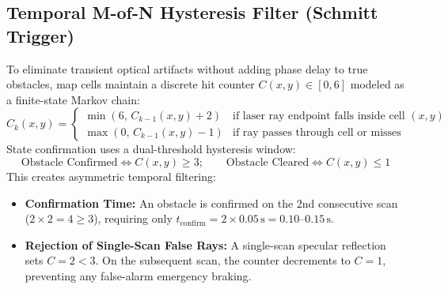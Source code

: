 \documentclass[11pt, a4paper]{article}
\begin{document}
\subsection{Temporal M-of-N Hysteresis Filter (Schmitt Trigger)}
To eliminate transient optical artifacts without adding phase delay to true obstacles, map cells maintain a discrete hit counter $C(x, y) \in [0, 6]$ modeled as a finite-state Markov chain:
\begin{equation}
    C_k(x, y) = \begin{cases} \min(6, \, C_{k-1}(x, y) + 2) & \text{if laser ray endpoint falls inside cell } (x, y) \\ \max(0, \, C_{k-1}(x, y) - 1) & \text{if ray passes through cell or misses} \end{cases}
\end{equation}
State confirmation uses a dual-threshold hysteresis window:
\begin{equation}
    \text{Obstacle Confirmed} \iff C(x, y) \ge 3; \qquad \text{Obstacle Cleared} \iff C(x, y) \le 1
\end{equation}
This creates asymmetric temporal filtering:
\begin{itemize}
    \item \textbf{Confirmation Time:} An obstacle is confirmed on the 2nd consecutive scan ($2 \times 2 = 4 \ge 3$), requiring only $t_{\text{confirm}} = 2 \times 0.05\,\text{s} = 0.10\text{--}0.15\,\text{s}$.
    \item \textbf{Rejection of Single-Scan False Rays:} A single-scan specular reflection sets $C = 2 < 3$. On the subsequent scan, the counter decrements to $C = 1$, preventing any false-alarm emergency braking.
\end{itemize}
\end{document}
